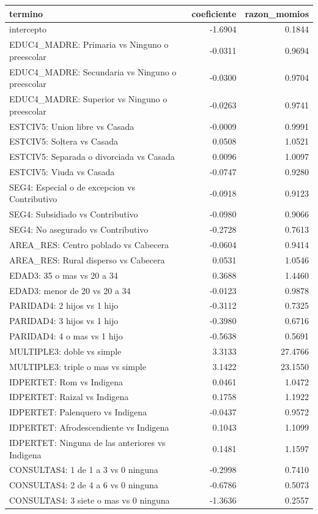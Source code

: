 \begin{tabular}{lrr}
\toprule
termino & coeficiente & razon\_momios \\
\midrule
intercepto & -1.6904 & 0.1844 \\
EDUC4\_MADRE: Primaria vs Ninguno o preescolar & -0.0311 & 0.9694 \\
EDUC4\_MADRE: Secundaria vs Ninguno o preescolar & -0.0300 & 0.9704 \\
EDUC4\_MADRE: Superior vs Ninguno o preescolar & -0.0263 & 0.9741 \\
ESTCIV5: Union libre vs Casada & -0.0009 & 0.9991 \\
ESTCIV5: Soltera vs Casada & 0.0508 & 1.0521 \\
ESTCIV5: Separada o divorciada vs Casada & 0.0096 & 1.0097 \\
ESTCIV5: Viuda vs Casada & -0.0747 & 0.9280 \\
SEG4: Especial o de excepcion vs Contributivo & -0.0918 & 0.9123 \\
SEG4: Subsidiado vs Contributivo & -0.0980 & 0.9066 \\
SEG4: No asegurado vs Contributivo & -0.2728 & 0.7613 \\
AREA\_RES: Centro poblado vs Cabecera & -0.0604 & 0.9414 \\
AREA\_RES: Rural disperso vs Cabecera & 0.0531 & 1.0546 \\
EDAD3: 35 o mas vs 20 a 34 & 0.3688 & 1.4460 \\
EDAD3: menor de 20 vs 20 a 34 & -0.0123 & 0.9878 \\
PARIDAD4: 2 hijos vs 1 hijo & -0.3112 & 0.7325 \\
PARIDAD4: 3 hijos vs 1 hijo & -0.3980 & 0.6716 \\
PARIDAD4: 4 o mas vs 1 hijo & -0.5638 & 0.5691 \\
MULTIPLE3: doble vs simple & 3.3133 & 27.4766 \\
MULTIPLE3: triple o mas vs simple & 3.1422 & 23.1550 \\
IDPERTET: Rom vs Indigena & 0.0461 & 1.0472 \\
IDPERTET: Raizal vs Indigena & 0.1758 & 1.1922 \\
IDPERTET: Palenquero vs Indigena & -0.0437 & 0.9572 \\
IDPERTET: Afrodescendiente vs Indigena & 0.1043 & 1.1099 \\
IDPERTET: Ninguna de las anteriores vs Indigena & 0.1481 & 1.1597 \\
CONSULTAS4: 1 de 1 a 3 vs 0 ninguna & -0.2998 & 0.7410 \\
CONSULTAS4: 2 de 4 a 6 vs 0 ninguna & -0.6786 & 0.5073 \\
CONSULTAS4: 3 siete o mas vs 0 ninguna & -1.3636 & 0.2557 \\
\bottomrule
\end{tabular}
